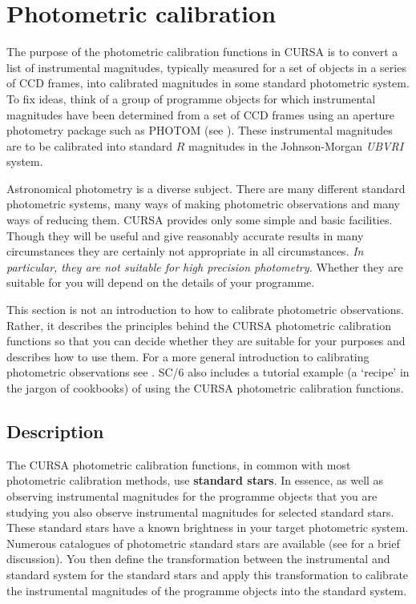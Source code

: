 \documentclass[twoside,11pt]{starlink}
\begin{document}
\section{\label{PHOTCAL}Photometric calibration}

The purpose of the photometric calibration functions in CURSA is to
convert a list of instrumental magnitudes, typically measured for a
set of objects in a series of CCD frames, into calibrated magnitudes
in some standard photometric system.  To fix ideas, think of a group
of programme objects for which instrumental magnitudes have been
determined from a set of CCD frames using an aperture photometry package
such as PHOTOM (see \cite{SUN45}).  These
instrumental magnitudes are to be calibrated into standard $R$
magnitudes in the Johnson-Morgan \textit{UBVRI}\, system.

Astronomical photometry is a diverse subject.  There are many different
standard photometric systems, many ways of making photometric
observations and many ways of reducing them.  CURSA provides only some
simple and basic facilities.  Though they will be useful and give
reasonably accurate results in many circumstances they are certainly
not appropriate in all circumstances.  \textit{In particular, they are
not suitable for high precision photometry.}  Whether they are suitable
for you will depend on the details of your programme.

This section is not an introduction to how to calibrate photometric
observations.  Rather, it describes the principles behind the CURSA
photometric calibration functions so that you can decide whether they
are suitable for your purposes and describes how to use them.  For a
more general introduction to calibrating photometric observations
see \cite{SC6}.  SC/6 also includes a tutorial example (a
`recipe' in the jargon of cookbooks) of using the CURSA photometric
calibration functions.


\subsection{Description}

The CURSA photometric calibration functions, in common with most photometric
calibration methods, use \textbf{standard stars}.  In essence, as well as
observing instrumental magnitudes for the programme objects that you are
studying you also observe instrumental magnitudes for selected standard
stars.  These standard stars have a known brightness in your target
photometric system.  Numerous catalogues of photometric standard stars
are available (see \cite{SC6} for a brief discussion).
You then define the transformation between the instrumental and standard
system for the standard stars and apply this transformation to
calibrate the instrumental magnitudes of the programme objects into
the standard system.
\end{document}
